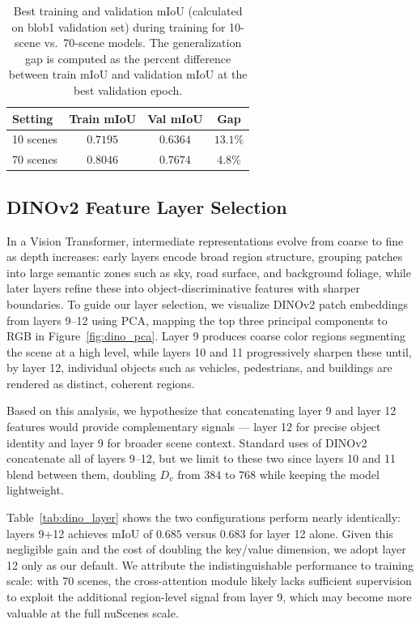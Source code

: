 \documentclass[10pt,twocolumn,letterpaper]{article}
\begin{document}
\begin{table}[t]
\centering
\begin{tabular}{lccc}
\hline
\textbf{Setting} & \textbf{Train mIoU} & \textbf{Val mIoU} & \textbf{Gap} \\
\hline
10 scenes & $0.7195$ & $0.6364$ & $13.1\%$ \\
70 scenes & $0.8046$ & $0.7674$ & $4.8\%$ \\
\hline
\end{tabular}
\caption{Best training and validation mIoU (calculated on blob1 validation set) during training for 10-scene vs.\ 70-scene models. The generalization gap is computed as the percent difference between train mIoU and validation mIoU at the best validation epoch.}
\label{tab:miou_gap}
\end{table}

\subsection{DINOv2 Feature Layer Selection}

In a Vision Transformer, intermediate representations evolve from coarse to fine as depth increases: early layers encode broad region structure, grouping patches into large semantic zones such as sky, road surface, and background foliage, while later layers refine these into object-discriminative features with sharper boundaries. To guide our layer selection, we visualize DINOv2 patch embeddings from layers 9--12 using PCA, mapping the top three principal components to RGB in Figure~\ref{fig:dino_pca}. Layer 9 produces coarse color regions segmenting the scene at a high level, while layers 10 and 11 progressively sharpen these until, by layer 12, individual objects such as vehicles, pedestrians, and buildings are rendered as distinct, coherent regions.

Based on this analysis, we hypothesize that concatenating layer 9 and layer 12 features would provide complementary signals — layer 12 for precise object identity and layer 9 for broader scene context. Standard uses of DINOv2 concatenate all of layers 9--12, but we limit to these two since layers 10 and 11 blend between them, doubling $D_v$ from $384$ to $768$ while keeping the model lightweight.

Table~\ref{tab:dino_layer} shows the two configurations perform nearly identically: layers 9+12 achieves mIoU of $0.685$ versus $0.683$ for layer 12 alone. Given this negligible gain and the cost of doubling the key/value dimension, we adopt layer 12 only as our default. We attribute the indistinguishable performance to training scale: with 70 scenes, the cross-attention module likely lacks sufficient supervision to exploit the additional region-level signal from layer 9, which may become more valuable at the full nuScenes scale.
\end{document}
